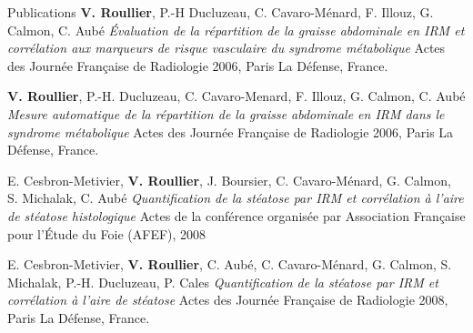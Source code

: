 \begin{rubric}{Publications}
  \entry*[2006]
  \textbf{V. Roullier}, P.-H Ducluzeau, C. Cavaro-Ménard, F. Illouz, G. Calmon, C. Aubé
  \textit{Évaluation de la répartition de la graisse abdominale en IRM et corrélation aux marqueurs de risque vasculaire du syndrome métabolique} 
  Actes des Journée Française de Radiologie 2006, Paris La Défense, France.

  \entry*[2006]
  \textbf{V. Roullier}, P.-H. Ducluzeau, C. Cavaro-Menard, F. Illouz, G. Calmon, C. Aubé 
  \textit{Mesure automatique de la répartition de la graisse abdominale en IRM dans le syndrome métabolique}
  Actes des Journée Française de Radiologie 2006, Paris La Défense, France.

  \entry*[2006]
  E. Cesbron-Metivier, \textbf{V. Roullier}, J. Boursier, C. Cavaro-Ménard, G. Calmon, S. Michalak, C. Aubé
  \textit{Quantification de la stéatose par IRM et corrélation à l'aire de stéatose histologique}  
  Actes de la conférence organisée par Association Française pour l'\'Etude du Foie (AFEF), 2008 

  \entry*[2006]
  E. Cesbron-Metivier, \textbf{V. Roullier}, C. Aubé, C. Cavaro-Ménard, G. Calmon, S. Michalak, P.-H. Ducluzeau, P. Cales
  \textit{Quantification de la stéatose par IRM et corrélation à l’aire de stéatose}  
  Actes des Journée Française de Radiologie 2008, Paris La Défense, France.


  
\end{rubric}
